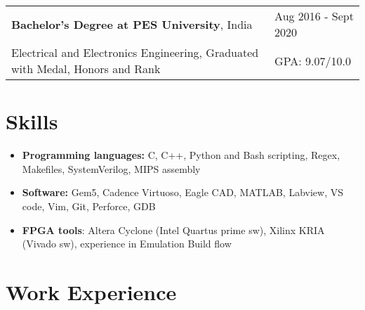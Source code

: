 \documentclass[a4paper,10pt]{article}
\begin{document}
\begin{tabularx}{\linewidth}{ @{}l X@{} }
\textbf{Bachelor's Degree at PES University}, India & \hfill Aug 2016 - Sept 2020 \\[2.75pt]
Electrical and Electronics Engineering, Graduated with Medal, Honors and Rank & \hfill GPA: 9.07/10.0
\end{tabularx}

\section{Skills}

\begin{minipage}[t]{\linewidth}
    \begin{itemize}[nosep, leftmargin=2em, itemsep=3pt]
    \item \textbf{Programming languages:} C, C++, Python and Bash scripting, Regex, Makefiles, SystemVerilog, MIPS assembly
    \item \textbf{Software:} Gem5, Cadence Virtuoso, Eagle CAD, MATLAB, Labview, VS code, Vim, Git, Perforce, GDB
    \item \textbf{FPGA tools}: Altera Cyclone (Intel Quartus prime sw), Xilinx KRIA (Vivado sw), experience in Emulation Build flow
    \end{itemize}
\end{minipage} 

\section{Work Experience}
\end{document}
